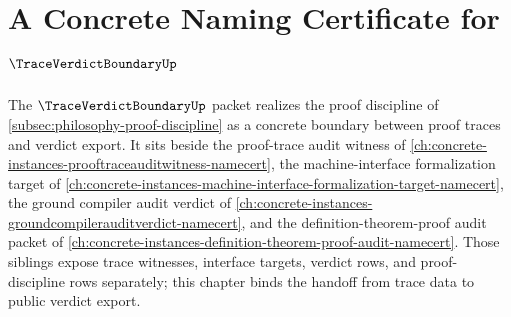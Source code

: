 \chapter{A Concrete Naming Certificate for $\TraceVerdictBoundaryUp$}
\label{ch:concrete-instances-trace-verdict-boundary-namecert}

The $\TraceVerdictBoundaryUp$ packet realizes the proof discipline of \autoref{subsec:philosophy-proof-discipline} as a concrete boundary between proof traces and verdict export. It sits beside the proof-trace audit witness of \autoref{ch:concrete-instances-prooftraceauditwitness-namecert}, the machine-interface formalization target of \autoref{ch:concrete-instances-machine-interface-formalization-target-namecert}, the ground compiler audit verdict of \autoref{ch:concrete-instances-groundcompilerauditverdict-namecert}, and the definition-theorem-proof audit packet of \autoref{ch:concrete-instances-definition-theorem-proof-audit-namecert}. Those siblings expose trace witnesses, interface targets, verdict rows, and proof-discipline rows separately; this chapter binds the handoff from trace data to public verdict export.

